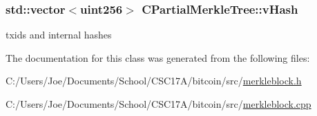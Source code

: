 \subsubsection[{v\+Hash}]{\setlength{\rightskip}{0pt plus 5cm}std\+::vector$<${\bf uint256}$>$ C\+Partial\+Merkle\+Tree\+::v\+Hash\hspace{0.3cm}{\ttfamily [protected]}}\label{class_c_partial_merkle_tree_a863cf9024be1b8fa97db08dfd6dbd687}
txids and internal hashes 

The documentation for this class was generated from the following files\+:\begin{DoxyCompactItemize}
\item 
C\+:/\+Users/\+Joe/\+Documents/\+School/\+C\+S\+C17\+A/bitcoin/src/\hyperlink{merkleblock_8h}{merkleblock.\+h}\item 
C\+:/\+Users/\+Joe/\+Documents/\+School/\+C\+S\+C17\+A/bitcoin/src/\hyperlink{merkleblock_8cpp}{merkleblock.\+cpp}\end{DoxyCompactItemize}

